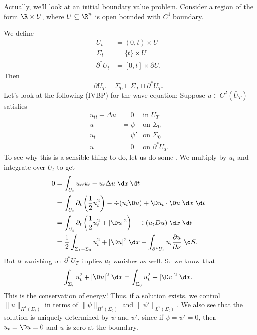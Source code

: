 \documentclass[a4paper]{article}
\begin{document}
Actually, we'll look at an initial boundary value problem. Consider a region of the form $\R \times U$, where $U \subseteq \R^n$ is open bounded with $C^1$ boundary.
\begin{center}
\end{center}
We define
\begin{align*}
  U_t &= (0, t) \times U\\
  \Sigma_t &= \{t\} \times U\\
  \partial^* U_t &= [0, t] \times \partial U.
\end{align*}
Then
\[
  \partial U_T = \Sigma_0 \sqcup \Sigma_T \sqcup \partial^* U_T.
\]
Let's look at the following  (IVBP) for the wave equation: Suppose $u \in C^2(\bar{U}_T)$ satisfies
\begin{align*}
  u_{tt} - \Delta u &= 0 & \text{in }U_T\\
  u &= \psi &\text{on }\Sigma_0\\
  u_t &= \psi' & \text{on }\Sigma_0\\
  u &= 0 &\text{on } \partial^* U_T
\end{align*}
To see why this is a sensible thing to do, let us do some . We multiply by $u_t$ and integrate over $U_t$ to get
\begin{align*}
  0 &= \int_{U_t} u_{tt} u_t - u_t \Delta u \;\d x\;\d t\\
  &= \int_{U_t} \partial_t \left(\frac{1}{2} u_t^2\right) - \div (u_t \D u) + \D u_t \cdot \D u\;\d x\;\d t\\
  &= \int_{U_t} \partial_t \left(\frac{1}{2} u_t^2 + |\D u|^2\right) - \div (u_t D u)\;\d x\;\d t\\
  &= \frac{1}{2} \int_{\Sigma_t - \Sigma_0} u_t^2 + |\D u|^2\;\d x - \int_{\partial^* U_t} u_t \frac{\partial u}{\partial \nu}\;\d S.
\end{align*}
But $u$ vanishing on $\partial^* U_T$ implies $u_t$ vanishes as well. So we know that
\[
  \int_{\Sigma_t} u_t^2 + |\D u|^2 \;\d x = \int_{\Sigma_0} u_t^2 + |\D u|^2 \;\d x.
\]
This is the conservation of energy! Thus, if a solution exists, we control $\|u\|_{H^1(\Sigma_t)}$ in terms of $\|\psi\|_{H^1(\Sigma_0)}$ and $\|\psi'\|_{L^2(\Sigma_0)}$. We also see that the solution is uniquely determined by $\psi$ and $\psi'$, since if $\psi = \psi' = 0$, then $u_t = \D u = 0$ and $u$ is zero at the boundary.
\end{document}
